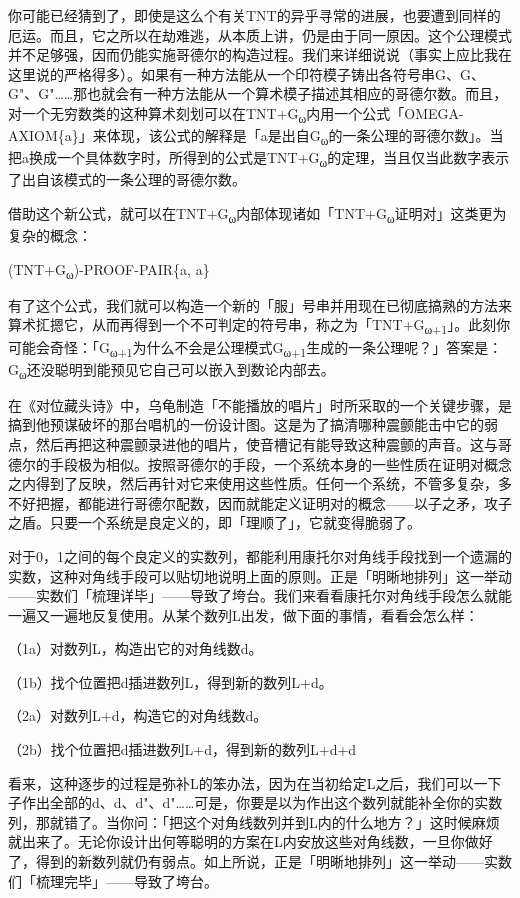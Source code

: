 \documentclass[
  12pt,
  twoside,
  openright,
  oldfontcommands,
]{memoir}
\begin{document}
你可能已经猜到了，即使是这么个有关TNT的异乎寻常的进展，也要遭到同样的厄运。而且，它之所以在劫难逃，从本质上讲，仍是由于同一原因。这个公理模式并不足够强，因而仍能实施哥德尔的构造过程。我们来详细说说（事实上应比我在这里说的严格得多）。如果有一种方法能从一个印符模子铸出各符号串G、G\textquotesingle、G"、G"\textquotesingle\ldots\ldots 那也就会有一种方法能从一个算术模子描述其相应的哥德尔数。而且，对一个无穷数类的这种算术刻划可以在TNT+G\textsubscript{ω}内用一个公式「OMEGA-AXIOM\{a\}」来体现，该公式的解释是「a是出自G\textsubscript{ω}的一条公理的哥德尔数」。当把a换成一个具体数字时，所得到的公式是TNT+G\textsubscript{ω}的定理，当且仅当此数字表示了出自该模式的一条公理的哥德尔数。

借助这个新公式，就可以在TNT+G\textsubscript{ω}内部体现诸如「TNT+G\textsubscript{ω}证明对」这类更为复杂的概念：

(TNT+G\textsubscript{ω})-PROOF-PAIR\{a, a\textquotesingle\}

有了这个公式，我们就可以构造一个新的「服」号串并用现在已彻底搞熟的方法来算术㧟摁它，从而再得到一个不可判定的符号串，称之为「TNT+G\textsubscript{ω+1}」。此刻你可能会奇怪：「G\textsubscript{ω+1}为什么不会是公理模式G\textsubscript{ω+1}生成的一条公理呢？」答案是：G\textsubscript{ω}还没聪明到能预见它自己可以嵌入到数论内部去。

在《对位藏头诗》中，乌龟制造「不能播放的唱片」时所采取的一个关键步骤，是搞到他预谋破坏的那台唱机的一份设计图。这是为了搞清哪种震颤能击中它的弱点，然后再把这种震颤录进他的唱片，使音槽记有能导致这种震颤的声音。这与哥德尔的手段极为相似。按照哥德尔的手段，一个系统本身的一些性质在证明对概念之内得到了反映，然后再针对它来使用这些性质。任何一个系统，不管多复杂，多不好把握，都能进行哥德尔配数，因而就能定义证明对的概念------以子之矛，攻子之盾。只要一个系统是良定义的，即「理顺了」，它就变得脆弱了。

对于0，1之间的每个良定义的实数列，都能利用康托尔对角线手段找到一个遗漏的实数，这种对角线手段可以贴切地说明上面的原则。正是「明晰地排列」这一举动------实数们「梳理详毕」------导致了垮台。我们来看看康托尔对角线手段怎么就能一遍又一遍地反复使用。从某个数列L出发，做下面的事情，看看会怎么样：

（1a）对数列L，构造出它的对角线数d。

（1b）找个位置把d插进数列L，得到新的数列L+d。

（2a）对数列L+d，构造它的对角线数d\textquotesingle。

（2b）找个位置把d\textquotesingle 插进数列L+d，得到新的数列L+d+d\textquotesingle{}

看来，这种逐步的过程是弥补L的笨办法，因为在当初给定L之后，我们可以一下子作出全部的d、d\textquotesingle、d"、d\textquotesingle"\ldots\ldots 可是，你要是以为作出这个数列就能补全你的实数列，那就错了。当你问：「把这个对角线数列并到L内的什么地方？」这时候麻烦就出来了。无论你设计出何等聪明的方案在L内安放这些对角线数，一旦你做好了，得到的新数列就仍有弱点。如上所说，正是「明晰地排列」这一举动------实数们「梳理完毕」------导致了垮台。
\end{document}
